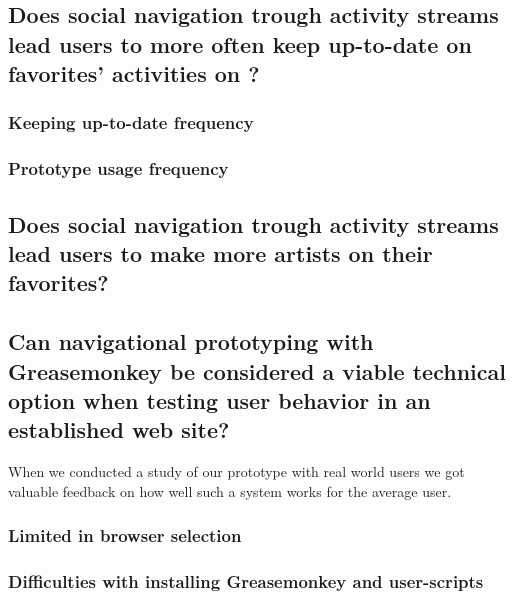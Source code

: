 \subsection{%
  Does social navigation trough activity streams lead users to more often keep
  up-to-date on favorites' activities on \urort{}?
}

\subsubsection{Keeping up-to-date frequency}

\subsubsection{Prototype usage frequency}



\subsection{%
  Does social navigation trough activity streams lead users to make
  more artists on \urort{} their favorites?
}

\subsection{%
  Can navigational prototyping with Greasemonkey be considered a
  viable technical option when testing user behavior in an
  established web site?
}

When we conducted a study of our prototype with real world users
we got valuable feedback on how well such a system works for the average user.

\subsubsection{Limited in browser selection}


\subsubsection{Difficulties with installing Greasemonkey and user-scripts}


